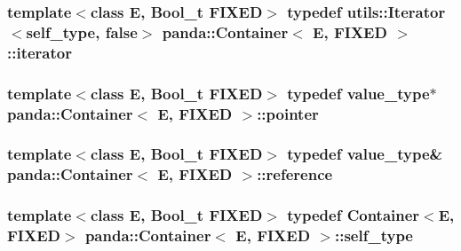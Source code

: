 \hypertarget{classpanda_1_1Container_a6cc72f63b5ff916743cfd82f3d06aace}{
\subsubsection[{iterator}]{\setlength{\rightskip}{0pt plus 5cm}template$<$class E, Bool\-\_\-t F\-I\-X\-E\-D$>$ typedef {\bf utils\-::\-Iterator}$<${\bf self\-\_\-type}, false$>$ {\bf panda\-::\-Container}$<$ E, F\-I\-X\-E\-D $>$\-::{\bf iterator}}}\label{classpanda_1_1Container_a6cc72f63b5ff916743cfd82f3d06aace}
\hypertarget{classpanda_1_1Container_ad46ede4b3ab0c2701ba870ace55eb4da}{
\subsubsection[{pointer}]{\setlength{\rightskip}{0pt plus 5cm}template$<$class E, Bool\-\_\-t F\-I\-X\-E\-D$>$ typedef {\bf value\-\_\-type}$\ast$ {\bf panda\-::\-Container}$<$ E, F\-I\-X\-E\-D $>$\-::{\bf pointer}}}\label{classpanda_1_1Container_ad46ede4b3ab0c2701ba870ace55eb4da}
\hypertarget{classpanda_1_1Container_a3b6330ccf0d9ed33975d098520f103cb}{
\subsubsection[{reference}]{\setlength{\rightskip}{0pt plus 5cm}template$<$class E, Bool\-\_\-t F\-I\-X\-E\-D$>$ typedef {\bf value\-\_\-type}\& {\bf panda\-::\-Container}$<$ E, F\-I\-X\-E\-D $>$\-::{\bf reference}}}\label{classpanda_1_1Container_a3b6330ccf0d9ed33975d098520f103cb}
\hypertarget{classpanda_1_1Container_a3c67ee697decfd9da487194415cce212}{
\subsubsection[{self\-\_\-type}]{\setlength{\rightskip}{0pt plus 5cm}template$<$class E, Bool\-\_\-t F\-I\-X\-E\-D$>$ typedef {\bf Container}$<$E, F\-I\-X\-E\-D$>$ {\bf panda\-::\-Container}$<$ E, F\-I\-X\-E\-D $>$\-::{\bf self\-\_\-type}}}\label{classpanda_1_1Container_a3c67ee697decfd9da487194415cce212}
